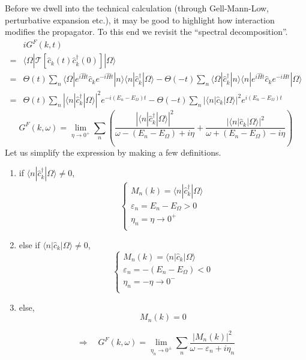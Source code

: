 Before we dwell into the technical calculation (through Gell-Mann-Low, perturbative expansion etc.), it may be good to highlight how interaction modifies the propagator. To this end we revisit the ``spectral decomposition''.
\begin{align*}
    &iG^F\left( k,t \right)\\
    =&\langle \Omega |\mathcal{T} \left[ \hat{c}_k\left( t \right) \hat{c}_{k}^{\dagger}\left( 0 \right) \right] |\Omega \rangle \\
    =&\Theta \left( t \right) \sum_n{\langle \Omega |e^{i\hat{H}t}\hat{c}_ke^{-i\hat{H}t}|n\rangle \langle n|\hat{c}_{k}^{\dagger}|\Omega \rangle}-\Theta \left( -t \right) \sum_n{\langle \Omega |\hat{c}_{k}^{\dagger}|n\rangle \langle n|e^{i\hat{H}t}\hat{c}_ke^{-i\hat{H}t}|\Omega \rangle}\\
    =&\Theta \left( t \right) \sum_n{\left| \langle n|\hat{c}_{k}^{\dagger}|\Omega \rangle \right|^2e^{-i\left( E_n-E_{\Omega} \right) t}}-\Theta \left( -t \right) \sum_n{\left| \langle n|\hat{c}_k|\Omega \rangle \right|^2e^{i\left( E_n-E_{\Omega} \right) t}}
\end{align*}
\[ G^F\left( k,\omega \right) =\lim_{\eta \rightarrow 0^+} \sum_n{\left( \frac{\left| \langle n|\hat{c}_{k}^{\dagger}|\Omega \rangle \right|^2}{\omega -\left( E_n-E_{\Omega} \right) +i\eta}+\frac{\left| \langle n|\hat{c}_k|\Omega \rangle \right|^2}{\omega +\left( E_n-E_{\Omega} \right) -i\eta} \right)}\]
Let us simplify the expression by making a few definitions.
\begin{enumerate}
    \item if $\langle n|\hat{c}_{k}^{\dagger}|\Omega \rangle \ne 0$,
    \[ \begin{cases}
        M_n\left( k \right) =\langle n|\hat{c}_{k}^{\dagger}|\Omega \rangle\\
        \varepsilon _n=E_n-E_{\Omega}>0\\
        \eta _n=\eta \rightarrow 0^+\\
    \end{cases} \]
    \item else if $\langle n|\hat{c}_k|\Omega \rangle \ne 0$,
    \[ \begin{cases}
        M_n\left( k \right) =\langle n|\hat{c}_k|\Omega \rangle\\
        \varepsilon _n=-\left( E_n-E_{\Omega} \right) <0\\
        \eta _n=-\eta \rightarrow 0^-\\
    \end{cases} \]
    \item else,
    \[ M_n\left( k \right) =0 \]
\end{enumerate}
\[ \Rightarrow \quad G^F\left( k,\omega \right) =\lim_{\eta _n\rightarrow 0^{\pm}} \sum_n{\frac{\left| M_n\left( k \right) \right|^2}{\omega -\varepsilon _n+i\eta _n}} \]

